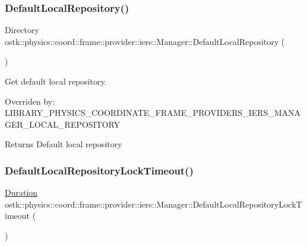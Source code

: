 \subsubsection{\texorpdfstring{Default\+Local\+Repository()}{DefaultLocalRepository()}}
{\footnotesize\ttfamily Directory ostk\+::physics\+::coord\+::frame\+::provider\+::iers\+::\+Manager\+::\+Default\+Local\+Repository (\begin{DoxyParamCaption}{ }\end{DoxyParamCaption})\hspace{0.3cm}{\ttfamily [static]}}



Get default local repository. 

Overriden by\+: L\+I\+B\+R\+A\+R\+Y\+\_\+\+P\+H\+Y\+S\+I\+C\+S\+\_\+\+C\+O\+O\+R\+D\+I\+N\+A\+T\+E\+\_\+\+F\+R\+A\+M\+E\+\_\+\+P\+R\+O\+V\+I\+D\+E\+R\+S\+\_\+\+I\+E\+R\+S\+\_\+\+M\+A\+N\+A\+G\+E\+R\+\_\+\+L\+O\+C\+A\+L\+\_\+\+R\+E\+P\+O\+S\+I\+T\+O\+RY

\begin{DoxyReturn}{Returns}
Default local repository 
\end{DoxyReturn}
\mbox{\label{classostk_1_1physics_1_1coord_1_1frame_1_1provider_1_1iers_1_1_manager_a00b7a5114cd80fbff515dd7af9381519}} 
\subsubsection{\texorpdfstring{Default\+Local\+Repository\+Lock\+Timeout()}{DefaultLocalRepositoryLockTimeout()}}
{\footnotesize\ttfamily \hyperlink{classostk_1_1physics_1_1time_1_1_duration}{Duration} ostk\+::physics\+::coord\+::frame\+::provider\+::iers\+::\+Manager\+::\+Default\+Local\+Repository\+Lock\+Timeout (\begin{DoxyParamCaption}{ }\end{DoxyParamCaption})\hspace{0.3cm}{\ttfamily [static]}}



